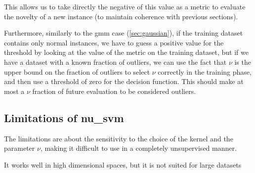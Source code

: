 This allows us to take directly the negative of this value as a metric to evaluate the novelty of a new instance (to maintain coherence with previous sections). 

Furthermore, similarly to the \gls{gmm} case (\autoref{sec:gaussian}), if the training dataset contains only normal instances, we have to guess a positive value for the threshold by looking at the value of the metric on the training dataset, but if we have a dataset with a known fraction of outliers, we can use the fact that $\nu$ is the upper bound on the fraction of outliers to select $\nu$ correctly in the training phase, and then use a threshold of zero for the decision function. This should make at most a $\nu$ fraction of future evaluation to be considered outliers.

\subsection{Limitations of \gls{nu_svm}}

The limitations are about the sensitivity to the choice of the kernel and the parameter $\nu$, making it difficult to use in a completely unsupervised manner. 

It works well in high dimensional spaces, but it is not suited for large datasets 